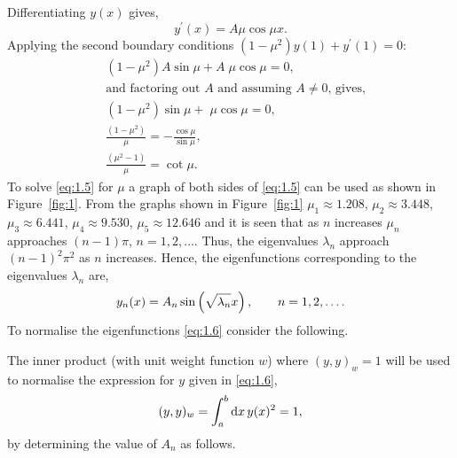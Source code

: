 \begin{description}[itemindent=-0.9cm]
Differentiating $y(x)$ gives,
\[
	y^\prime (x) = A\mu\cos \mu x.
\]
Applying the second boundary conditions $(1-\mu^2)y(1) + y^\prime(1)=0$:
\begin{align}
	&(1-\mu^2)A\sin \mu + A\;\mu\cos \mu = 0,\nonumber\\
	&\text{and factoring out $A$ and assuming $A\ne0$, gives,}\nonumber\\
	\label{eq:1.4}
	&(1-\mu^2)\sin \mu + \;\mu\cos \mu = 0,\\
	&\frac{(1-\mu^2)}{\mu} = -\frac{\cos \mu}{\sin \mu},\nonumber\\
	\label{eq:1.5}
	&\frac{(\mu^2-1)}{\mu} = \cot \mu.
\end{align}
To solve \eqref{eq:1.5} for $\mu$ a graph of both sides of \eqref{eq:1.5} can be used as shown in Figure~\ref{fig:1}.
From the graphs shown in Figure~\ref{fig:1} $\mu_1\approx 1.208$, $\mu_2\approx 3.448$, $\mu_3\approx 6.441$, $\mu_4\approx 9.530$, $\mu_5\approx 12.646$ and it is seen that as $n$ increases $\mu_n$ approaches $(n-1)\pi$, $n=1,2,\ldots$. Thus, the eigenvalues $\lambda_n$ approach $(n-1)^2\pi^2$ as $n$ increases. Hence, the eigenfunctions corresponding to the eigenvalues $\lambda_n$ are, 
\begin{equation}
\label{eq:1.6}
	y_n(x) = A_n \sin\left(\sqrt{\lambda_n}x\right),\qquad n = 1,2,\ldots.
\end{equation}
To normalise the eigenfunctions \eqref{eq:1.6} consider the following.
\begin{figure}[h!]
\end{figure}

The inner product (with unit weight function $w$) where $(y,y)_w=1$ will be used to normalise the expression for $y$ given in \eqref{eq:1.6},
\begin{equation}
\label{eq:1.7}
	(y,y)_w = \int_{a}^{b}\mathrm{d} x\, y(x)^2 = 1,
\end{equation}
by determining the value of $A_n$ as follows.  


\end{description}

